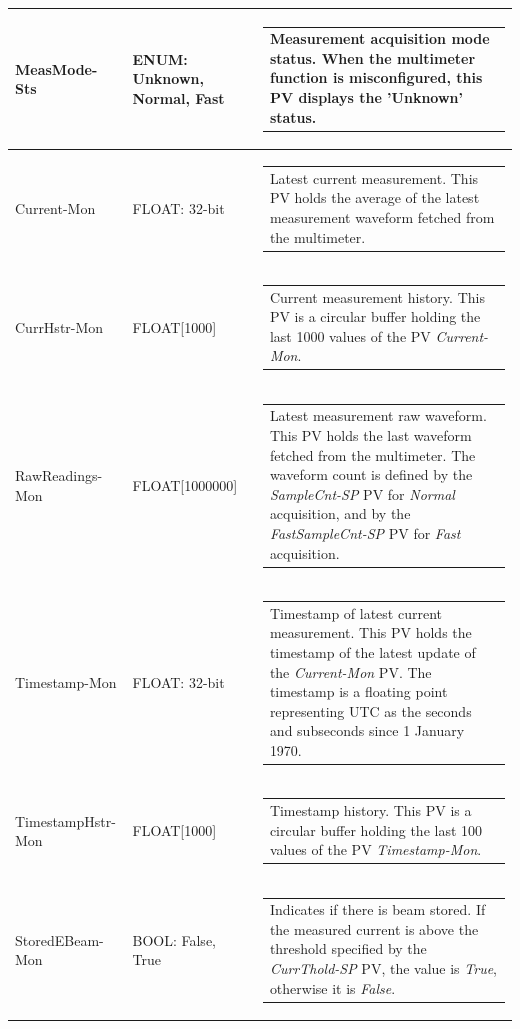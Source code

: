 \documentclass[openany]{article}
\begin{document}
\begin{longtable}{| m{3.0cm} m{4.5cm} m{7.0cm} |}
		MeasMode-Sts & ENUM: Unknown, Normal, Fast & \begin{tabular}{@{}m{6cm}@{}}
	    					Measurement acquisition mode status. When the multimeter function is misconfigured, this PV displays the 'Unknown' status.
						\end{tabular} \\ \hline
		Current-Mon & FLOAT: 32-bit & \begin{tabular}{@{}m{6cm}@{}}
	    					Latest current measurement. This PV holds the average of the latest measurement waveform fetched from the multimeter.
						\end{tabular} \\ \hline
		CurrHstr-Mon & FLOAT[1000] & \begin{tabular}{@{}m{6cm}@{}}
	    					Current measurement history. This PV is a circular buffer holding the last 1000 values of the PV \emph{Current-Mon}.
						\end{tabular} \\ \hline
		RawReadings-Mon & FLOAT[1000000] & \begin{tabular}{@{}m{6cm}@{}}
	    					Latest measurement raw waveform. This PV holds the last waveform fetched from the multimeter. The waveform count is defined by the \emph{SampleCnt-SP} PV for \emph{Normal} acquisition, and by the \emph{FastSampleCnt-SP} PV for \emph{Fast} acquisition.
						\end{tabular} \\ \hline
		Timestamp-Mon & FLOAT: 32-bit & \begin{tabular}{@{}m{6cm}@{}}
	    					Timestamp of latest current measurement. This PV holds the timestamp of the latest update of the \emph{Current-Mon} PV. The timestamp is a floating point representing UTC as the seconds and subseconds since 1 January 1970.
						\end{tabular} \\ \hline
		TimestampHstr-Mon & FLOAT[1000] & \begin{tabular}{@{}m{6cm}@{}}
	    					Timestamp history. This PV is a circular buffer holding the last 100 values of the PV \emph{Timestamp-Mon}.
						\end{tabular} \\ \hline
		StoredEBeam-Mon & BOOL: False, True & \begin{tabular}{@{}m{6cm}@{}}
	    					Indicates if there is beam stored. If the measured current is above the threshold specified by the \emph{CurrThold-SP} PV, the value is \emph{True}, otherwise it is \emph{False}.

\end{tabular}
\end{longtable}
\end{document}
